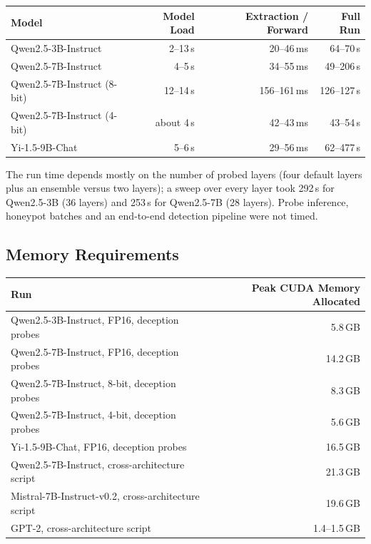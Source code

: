 \documentclass[11pt,letterpaper]{article}
\let\origsubsection\subsection
\renewcommand{\subsection}{\needspace{8\baselineskip}\origsubsection}}
\begin{document}
\begin{center}
\begin{tabular}{lrrr}
\toprule
\textbf{Model} & \textbf{Model Load} & \textbf{Extraction / Forward} & \textbf{Full Run} \\
\midrule
\rowcolor{backgroundgray} Qwen2.5-3B-Instruct & 2--13\,s & 20--46\,ms & 64--70\,s \\
Qwen2.5-7B-Instruct & 4--5\,s & 34--55\,ms & 49--206\,s \\
\rowcolor{backgroundgray} Qwen2.5-7B-Instruct (8-bit) & 12--14\,s & 156--161\,ms & 126--127\,s \\
Qwen2.5-7B-Instruct (4-bit) & about 4\,s & 42--43\,ms & 43--54\,s \\
\rowcolor{backgroundgray} Yi-1.5-9B-Chat & 5--6\,s & 29--56\,ms & 62--477\,s \\
\bottomrule
\end{tabular}
\end{center}

The run time depends mostly on the number of probed layers (four default layers plus an ensemble versus two layers); a sweep over every layer took 292\,s for Qwen2.5-3B (36 layers) and 253\,s for Qwen2.5-7B (28 layers). Probe inference, honeypot batches and an end-to-end detection pipeline were not timed.

\subsection{Memory Requirements}

\begin{center}
\begin{tabular}{lr}
\toprule
\textbf{Run} & \textbf{Peak CUDA Memory Allocated} \\
\midrule
\rowcolor{backgroundgray} Qwen2.5-3B-Instruct, FP16, deception probes & 5.8\,GB \\
Qwen2.5-7B-Instruct, FP16, deception probes & 14.2\,GB \\
\rowcolor{backgroundgray} Qwen2.5-7B-Instruct, 8-bit, deception probes & 8.3\,GB \\
Qwen2.5-7B-Instruct, 4-bit, deception probes & 5.6\,GB \\
\rowcolor{backgroundgray} Yi-1.5-9B-Chat, FP16, deception probes & 16.5\,GB \\
Qwen2.5-7B-Instruct, cross-architecture script & 21.3\,GB \\
\rowcolor{backgroundgray} Mistral-7B-Instruct-v0.2, cross-architecture script & 19.6\,GB \\
GPT-2, cross-architecture script & 1.4--1.5\,GB \\
\bottomrule
\end{tabular}
\end{center}
\end{document}
